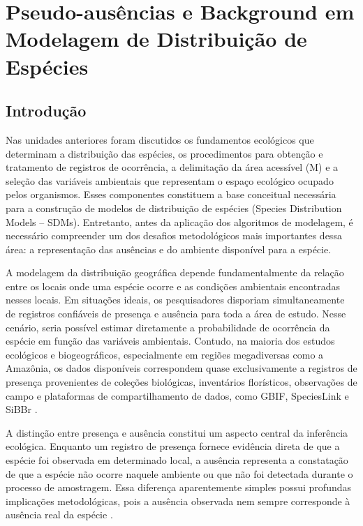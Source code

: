 \section{Pseudo-ausências e Background em Modelagem de Distribuição de Espécies}

\subsection{Introdução}

Nas unidades anteriores foram discutidos os fundamentos ecológicos que determinam a distribuição das espécies, os procedimentos para obtenção e tratamento de registros de ocorrência, a delimitação da área acessível (M) e a seleção das variáveis ambientais que representam o espaço ecológico ocupado pelos organismos. Esses componentes constituem a base conceitual necessária para a construção de modelos de distribuição de espécies (Species Distribution Models -- SDMs). Entretanto, antes da aplicação dos algoritmos de modelagem, é necessário compreender um dos desafios metodológicos mais importantes dessa área: a representação das ausências e do ambiente disponível para a espécie.

A modelagem da distribuição geográfica depende fundamentalmente da relação entre os locais onde uma espécie ocorre e as condições ambientais encontradas nesses locais. Em situações ideais, os pesquisadores disporiam simultaneamente de registros confiáveis de presença e ausência para toda a área de estudo. Nesse cenário, seria possível estimar diretamente a probabilidade de ocorrência da espécie em função das variáveis ambientais. Contudo, na maioria dos estudos ecológicos e biogeográficos, especialmente em regiões megadiversas como a Amazônia, os dados disponíveis correspondem quase exclusivamente a registros de presença provenientes de coleções biológicas, inventários florísticos, observações de campo e plataformas de compartilhamento de dados, como GBIF, SpeciesLink e SiBBr \citep{franklin2010mapping}.

A distinção entre presença e ausência constitui um aspecto central da inferência ecológica. Enquanto um registro de presença fornece evidência direta de que a espécie foi observada em determinado local, a ausência representa a constatação de que a espécie não ocorre naquele ambiente ou que não foi detectada durante o processo de amostragem. Essa diferença aparentemente simples possui profundas implicações metodológicas, pois a ausência observada nem sempre corresponde à ausência real da espécie \citep{guisan2017habitat}.

